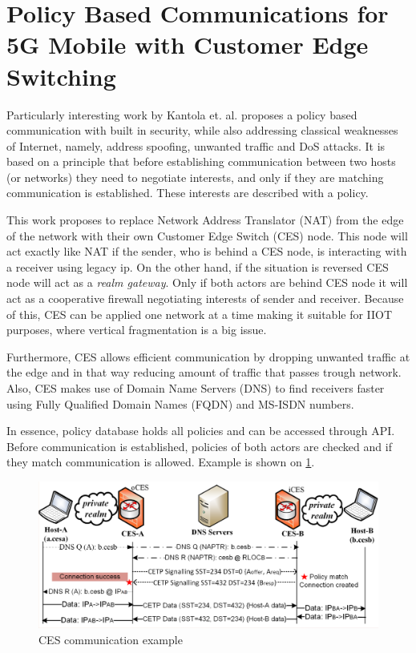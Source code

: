\section{Policy Based Communications for 5G Mobile with Customer Edge Switching}
\label{CES}

Particularly interesting work by Kantola et. al.\cite{Kantola,5480987} proposes a policy based communication with built in security, while also addressing classical weaknesses of Internet, namely, address spoofing, unwanted traffic and DoS attacks. It is based on a principle that before establishing communication between two hosts (or networks) they need to negotiate interests, and only if they are matching communication is established. These interests are described with a policy.

This work proposes to replace Network Address Translator (NAT) from the edge of the network with their own Customer Edge Switch (CES) node. This node will act exactly like NAT if the sender, who is behind a CES node, is interacting with a receiver using legacy ip. On the other hand, if the situation is reversed CES node will act as a \emph{realm gateway}. Only if both actors are behind CES node it will act as a cooperative firewall negotiating interests of sender and receiver. Because of this, CES can be applied one network at a time making it suitable for IIOT purposes, where vertical fragmentation is a big issue.

Furthermore, CES allows efficient communication by dropping unwanted traffic at the edge and in that way reducing amount of traffic that passes trough network. Also, CES makes use of Domain Name Servers (DNS) to find receivers faster using Fully Qualified Domain Names (FQDN) and MS-ISDN numbers.

In essence, policy database holds all policies and can be accessed through API. Before communication is established, policies of both actors are checked and if they match communication is allowed. Example is shown on \ref{fig:PolicyBasedCommunicationExample}.

\begin{figure}[ht]
	\begin{center}
		\includegraphics[width=\textwidth]{images/PolicyBasedCommunicationExample}
		\caption{CES communication example}
		\label{fig:PolicyBasedCommunicationExample}
	\end{center}
\end{figure}
